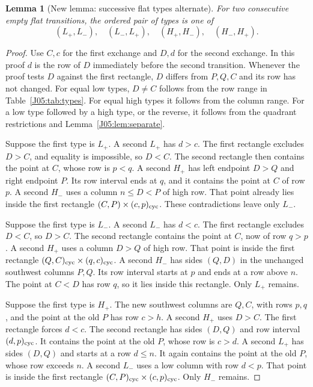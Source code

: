 \documentclass[11pt,oneside]{report}
\newtheorem{lemma}[theorem]{Lemma}
\theoremstyle{definition}
\numberwithin{equation}{section}
\newcommand{\Lp}{L_+}\newcommand{\Lm}{L_-}
\newcommand{\Hp}{H_+}\newcommand{\Hm}{H_-}
\begin{document}
\begin{lemma}[New lemma: successive flat types alternate]
\label{J05:lem:alternate}
For two consecutive empty flat transitions, the ordered pair of types is one
of
\[
 (\Lp,\Lm),\quad(\Lm,\Lp),\quad
 (\Hp,\Hm),\quad(\Hm,\Hp).
\]
\end{lemma}
\begin{proof}
Use $C,c$ for the first exchange and $D,d$ for the second exchange. In this
proof $d$ is the row of $D$ immediately before the second transition. Whenever
the proof tests $D$ against the first rectangle, $D$ differs from $P,Q,C$ and
its row has not changed. For equal low types, $D\ne C$ follows from the row
range in Table~\ref{J05:tab:types}. For equal high types it follows from the
column range. For a low type followed by a high type, or the reverse, it
follows from the quadrant restrictions and Lemma~\ref{J05:lem:separate}.

Suppose the first type is $\Lp$. A second $\Lp$ has $d>c$.
The first rectangle excludes $D>C$, and equality is impossible, so $D<C$.
The second rectangle then contains the point at $C$, whose row is $p<q$.
A second $\Hp$ has left endpoint $D>Q$ and right endpoint $P$.
Its row interval ends at $q$, and it contains the point at $C$ of row $p$.
A second $\Hm$ uses a column $n\leq D<P$ of high row. That point already
lies inside the first rectangle $(C,P)\times(c,p)_{\rm cyc}$.
These contradictions leave only $\Lm$.

Suppose the first type is $\Lm$. A second $\Lm$ has $d<c$.
The first rectangle excludes $D<C$, so $D>C$. The second rectangle contains
the point at $C$, now of row $q>p$.
A second $\Hp$ uses a column $D>Q$ of high row. That point is inside the
first rectangle $(Q,C)_{\rm cyc}\times(q,c)_{\rm cyc}$.
A second $\Hm$ has sides $(Q,D)$ in the unchanged southwest columns
$P,Q$. Its row interval starts at $p$ and ends at a row above $n$. The point
at $C<D$ has row $q$, so it lies inside this rectangle.
Only $\Lp$ remains.

Suppose the first type is $\Hp$. The new southwest columns are $Q,C$,
with rows $p,q$, and the point at the old $P$ has row $c>h$.
A second $\Hp$ uses $D>C$. The first rectangle forces $d<c$.
The second rectangle has sides $(D,Q)$ and row interval $(d,p)_{\rm cyc}$.
It contains the point at the old $P$, whose row is $c>d$.
A second $\Lp$ has sides $(D,Q)$ and starts at a row $d\leq n$.
It again contains the point at the old $P$, whose row exceeds $n$.
A second $\Lm$ uses a low column with row $d<p$. That point is inside the
first rectangle $(C,P)_{\rm cyc}\times(c,p)_{\rm cyc}$.
Only $\Hm$ remains.


\end{proof}
\end{document}
